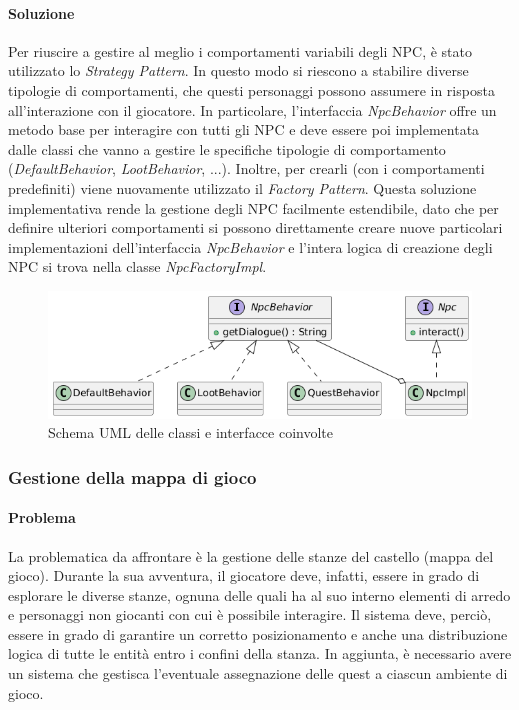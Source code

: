\documentclass[a4paper,12pt]{report}
\begin{document}
\paragraph{Soluzione} Per riuscire a gestire al meglio i comportamenti variabili degli NPC, è stato utilizzato lo \textit{Strategy Pattern}.
In questo modo si riescono a stabilire diverse tipologie di comportamenti, che questi personaggi possono assumere in risposta all'interazione con il giocatore.
In particolare, l'interfaccia \textit{NpcBehavior} offre un metodo base per interagire con tutti gli NPC e deve essere poi implementata dalle classi che vanno a gestire 
le specifiche tipologie di comportamento (\textit{DefaultBehavior}, \textit{LootBehavior}, ...).\newline
Inoltre, per crearli (con i comportamenti predefiniti) viene nuovamente utilizzato il \textit{Factory Pattern}.\newline
Questa soluzione implementativa rende la gestione degli NPC facilmente estendibile, dato che per definire ulteriori comportamenti si possono direttamente 
creare nuove particolari implementazioni dell'interfaccia \textit{NpcBehavior} e l'intera logica di creazione degli NPC si trova nella classe \textit{NpcFactoryImpl}.\newline

\begin{figure}[H]
	\centering
	\includegraphics[width=\textwidth]{img/NpcUML.png}
	\caption{Schema UML delle classi e interfacce coinvolte}
	\label{img:NpcUML}
\end{figure}


\subsubsection{Gestione della mappa di gioco}
\paragraph{Problema} La problematica da affrontare è la gestione delle stanze del castello (mappa del gioco).
Durante la sua avventura, il giocatore deve, infatti, essere in grado di esplorare le diverse stanze, ognuna delle quali 
ha al suo interno elementi di arredo e personaggi non giocanti con cui è possibile interagire.
Il sistema deve, perciò, essere in grado di garantire un corretto posizionamento e anche una distribuzione logica di tutte le entità entro i confini della stanza.\newline
In aggiunta, è necessario avere un sistema che gestisca l'eventuale assegnazione delle quest a ciascun ambiente di gioco.
\end{document}
